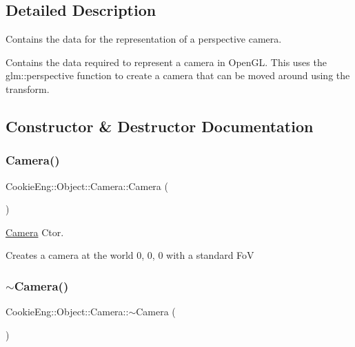 \subsection{Detailed Description}
Contains the data for the representation of a perspective camera. 

Contains the data required to represent a camera in Open\+GL. This uses the glm\+::perspective function to create a camera that can be moved around using the transform. 

\subsection{Constructor \& Destructor Documentation}
\mbox{\label{class_cookie_eng_1_1_object_1_1_camera_aa98f73385bfef2dd29f3763dd6a7549c}} 
\subsubsection{\texorpdfstring{Camera()}{Camera()}}
{\footnotesize\ttfamily Cookie\+Eng\+::\+Object\+::\+Camera\+::\+Camera (\begin{DoxyParamCaption}{ }\end{DoxyParamCaption})}



\hyperlink{class_cookie_eng_1_1_object_1_1_camera}{Camera} Ctor. 

Creates a camera at the world 0, 0, 0 with a standard FoV \mbox{\label{class_cookie_eng_1_1_object_1_1_camera_a8d672ca800d63af6fe3d6665471a2b05}} 
\subsubsection{\texorpdfstring{$\sim$\+Camera()}{~Camera()}}
{\footnotesize\ttfamily Cookie\+Eng\+::\+Object\+::\+Camera\+::$\sim$\+Camera (\begin{DoxyParamCaption}{ }\end{DoxyParamCaption})\hspace{0.3cm}{\ttfamily [inline]}}



